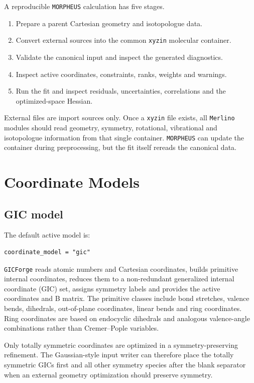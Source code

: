 \documentclass[11pt]{article}
\newcommand{\program}{\texttt{MORPHEUS}}
\newcommand{\merlino}{\texttt{Merlino}}
\newcommand{\xyzin}{\texttt{xyzin}}
\newcommand{\gicforge}{\texttt{GICForge}}
\begin{document}
A reproducible \program{} calculation has five stages.

\begin{enumerate}
  \item Prepare a parent Cartesian geometry and isotopologue data.
  \item Convert external sources into the common \xyzin{} molecular container.
  \item Validate the canonical input and inspect the generated diagnostics.
  \item Inspect active coordinates, constraints, ranks, weights and warnings.
  \item Run the fit and inspect residuals, uncertainties, correlations and the
        optimized-space Hessian.
\end{enumerate}

External files are import sources only.  Once a \xyzin{} file exists, all
\merlino{} modules should read geometry, symmetry, rotational, vibrational and
isotopologue information from that single container.  \program{} can update the
container during preprocessing, but the fit itself rereads the canonical data.

\section{Coordinate Models}

\subsection{GIC model}

The default active model is:

\begin{lstlisting}[style=merlino]
coordinate_model = "gic"
\end{lstlisting}

\gicforge{} reads atomic numbers and Cartesian coordinates, builds primitive
internal coordinates, reduces them to a non-redundant generalized internal
coordinate (GIC) set, assigns symmetry labels and provides the active
coordinates and B matrix.  The primitive classes include bond stretches,
valence bends, dihedrals, out-of-plane coordinates, linear bends and ring
coordinates.  Ring coordinates are based on endocyclic dihedrals and analogous
valence-angle combinations rather than Cremer--Pople variables.

Only totally symmetric coordinates are optimized in a symmetry-preserving
refinement.  The Gaussian-style input writer can therefore place the totally
symmetric GICs first and all other symmetry species after the blank separator
when an external geometry optimization should preserve symmetry.
\end{document}
